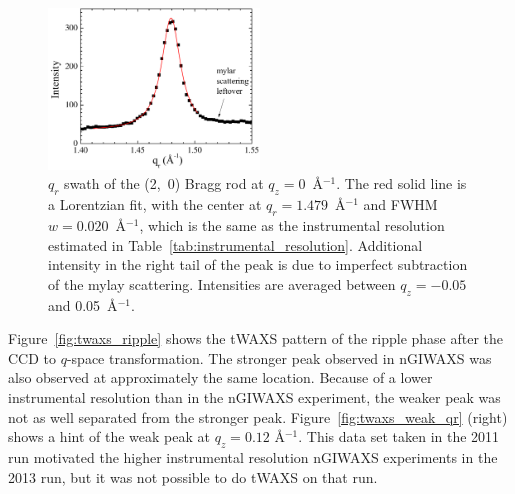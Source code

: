 \begin{figure}[htbp]
  \centering
  \includegraphics[width=0.5\textwidth]{figures/ripple/tWAXS/twaxs_gel_qr_20}
  \caption[$q_r$ swath of the (2,~0) Bragg rod at $q_z=0$~\AA$^{-1}$]
  {$q_r$ swath of the (2,~0) Bragg rod at $q_z=0$~\AA$^{-1}$.
  The red solid line is a Lorentzian fit, with the center at $q_r=1.479$~\AA$^{-1}$
  and FWHM $w=0.020$~\AA$^{-1}$, which is the same as the instrumental resolution
  estimated in Table~\ref{tab:instrumental_resolution}.
  Additional intensity in the right tail of the peak is due to imperfect subtraction
  of the mylay scattering.
  Intensities are averaged between $q_z=-0.05$ and 0.05~\AA$^{-1}$.}
  \label{fig:twaxs_gel_qr}
\end{figure}

Figure~\ref{fig:twaxs_ripple} shows the tWAXS pattern of the ripple phase 
after the CCD to $q$-space transformation. The stronger
peak observed in nGIWAXS was also observed at approximately the same location.
Because of a lower instrumental resolution than in the nGIWAXS experiment,
the weaker peak was not as well separated from the stronger peak. 
Figure~\ref{fig:twaxs_weak_qr} (right) shows
a hint of the weak peak at $q_z=0.12$ \AA$^{-1}$. This
data set taken in the 2011 run motivated
the higher instrumental resolution nGIWAXS experiments
in the 2013 run, but it was not possible to do tWAXS on that run.

